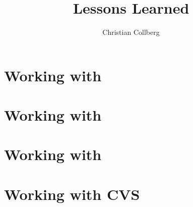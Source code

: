 \documentclass{book}
\title{Lessons Learned}
\author{Christian Collberg}
\begin{document}
\maketitle

\setcounter{secnumdepth}{1}
\tableofcontents

\chapter{Working with \BCEL}


\chapter{Working with \BLOAT}


\chapter{Working with \SM}


\chapter{Working with CVS}

\end{document}
